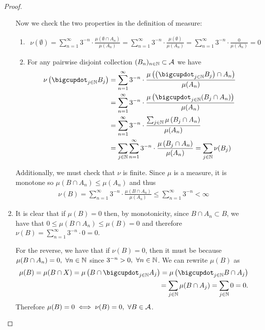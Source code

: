 \begin{proof}
\begin{enumerate}
		Now we check the two properties in the definition of measure:
		\begin{enumerate}
			\item
			\begin{align*}
			\nu(\emptyset) = \sum_{n=1}^{\infty} 3^{-n} \cdot \frac{\mu(\emptyset \cap A_n)}{\mu(A_n)} = \sum_{n=1}^{\infty} 3^{-n} \cdot \frac{\mu(\emptyset)}{\mu(A_n)} = \sum_{n=1}^{\infty} 3^{-n} \cdot \frac{0}{\mu(A_n)} = 0
			\end{align*}
			\item For any pairwise disjoint collection $(B_n)_{n\in \mathbb{N}} \subset \mathcal{A}$ we have
			\begin{align*}
			\nu\left(\bigcupdot_{j\in \N} B_j\right) &= \sum_{n = 1}^\infty 3^{-n} \cdot \frac{\mu\left(\left(\bigcupdot_{j\in \N} B_j\right) \cap A_n\right)}{\mu(A_n)}\\
			&= \sum_{n = 1}^\infty 3^{-n} \cdot \frac{\mu\left(\bigcupdot_{j\in \N} (B_j \cap A_n)\right)}{\mu(A_n)} \\
			&= \sum_{n = 1}^\infty 3^{-n} \cdot \frac{\sum_{j \in \N}\mu\left(B_j \cap A_n\right)}{\mu(A_n)} \\
			&= \sum_{j\in\N} \sum_{n=1}^{\infty} 3^{-n}\cdot \frac{\mu\left(B_j \cap A_n\right)}{\mu(A_n)} = \sum_{j \in \N} \nu(B_j)
			\end{align*}
		\end{enumerate}
		
		Additionally, we must check that $\nu$ is finite. Since $\mu$ is a measure, it is monotone so $\mu(B \cap A_n) \leq \mu(A_n)$ and thus
		\begin{align*}
		\nu(B) = \sum_{n = 1}^{\infty} 3^{-n} \cdot \frac{\mu(B \cap A_n)}{\mu (A_n)} \leq \sum_{n = 1}^{\infty} 3^{-n} < \infty
		\end{align*}
		
		
		\item It is clear that if $\mu(B) = 0$ then, by monotonicity, since $B \cap A_n \subset B$, we have that $0 \leq \mu(B \cap A_n) \leq \mu(B) = 0$ and therefore $\nu(B) = \sum_{n = 1}^\infty 3^{-n} \cdot 0 = 0$.
		
		For the reverse, we have that if $\nu(B) = 0$, then it must be because $\mu(B \cap A_n) = 0,\ \forall n \in \N$ since $3^{-n} > 0,\ \forall n \in \mathbb{N}$. We can rewrite $\mu(B)$ as
		\begin{align*}
		\mu(B) = \mu(B \cap X) = \mu\left(B \cap \bigcupdot_{j\in \N} A_j\right) = \mu\left(\bigcupdot_{j\in \N} B \cap A_j\right) \\
		= \sum_{j \in \N} \mu(B \cap A_j) = \sum_{j \in \N} 0 = 0.
		\end{align*}
		Therefore $\mu(B) = 0 \iff \nu(B) = 0,\ \forall B \in \mathcal{A}$.
	\end{enumerate}
\end{proof}

